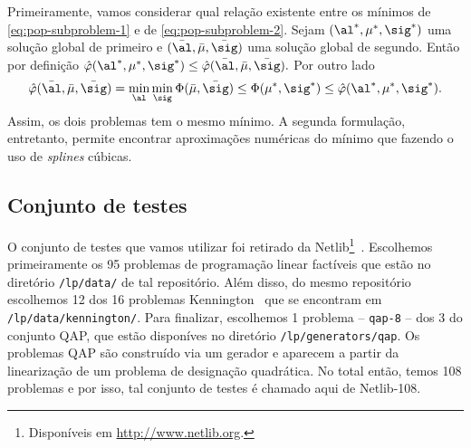 Primeiramente, vamos considerar qual relação existente entre os mínimos de \eqref{eq:pop-subproblem-1} e de \eqref{eq:pop-subproblem-2}. Sejam $(\al^*,\mu^*,\sig^*)$ uma solução global de  primeiro e $(\bar{\al}, \bar{\mu},\bar{\sig})$ uma solução global de segundo. Então por definição
$ \nextphi(\al^*,\mu^*,\sig^*) \leq \nextphi (\bar{\al},\bar{\mu},\bar{\sig}).$
Por outro lado 
\[
\nextphi(\baral,\barmu,\barsig) = \min_{\al}\min_{\sig}\Phi(\barmu,\barsig) \leq \Phi(\mu^{*},\sig^{*}) \leq \nextphi(\al^*,\mu^*,\sig^*).
\]
Assim, os dois problemas tem o mesmo mínimo. A segunda formulação, entretanto, permite encontrar aproximações numéricas do mínimo que fazendo o uso de \emph{splines} cúbicas. 






\subsection{Conjunto de testes}

O conjunto de testes que vamos utilizar foi retirado da Netlib\footnote{Disponíveis em \url{http://www.netlib.org}.}~\cite{Dongarra:1987jk}. Escolhemos primeiramente os \num{95} problemas de programação linear factíveis que estão no diretório \verb|/lp/data/| de tal repositório.  Além disso, do mesmo repositório escolhemos \num{12} dos \num{16} problemas Kennington~\cite{Kennington:1990vo} que se encontram em \verb|/lp/data/kennington/|. Para finalizar, escolhemos 1 problema -- \texttt{qap-8} -- dos \num{3} do conjunto  QAP, que estão disponíves no diretório \verb|/lp/generators/qap|. Os problemas QAP são  construído via um gerador  e  aparecem a partir da linearização de um problema  de designação quadrática. No total então, temos 108 problemas e por isso, tal conjunto de testes é chamado aqui de Netlib-108. 



